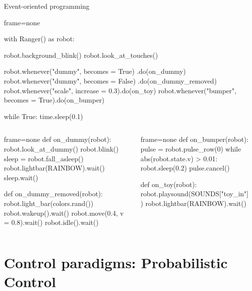 \documentclass[compress]{beamer}
\begin{document}
\begin{frame}[fragile]{Event-oriented programming}
\begin{overprint}
\begin{pythoncode*}{frame=none}

with Ranger() as robot:

    robot.background_blink()
    robot.look_at_touches()

    robot.whenever("dummy", becomes = True)
                                .do(on_dummy)
    robot.whenever("dummy", becomes = False)
                                .do(on_dummy_removed)
    robot.whenever("scale", increase = 0.3).do(on_toy)
    robot.whenever("bumper", becomes = True).do(on_bumper)

    while True:
        time.sleep(0.1)
\end{pythoncode*}

    
    
    \begin{columns}
        \begin{column}{0.45\linewidth}
            \begin{pythoncode*}{frame=none}
def on_dummy(robot):
    robot.look_at_dummy()
    robot.blink()
    sleep = robot.fall_asleep()
    robot.lightbar(RAINBOW).wait()
    sleep.wait()

def on_dummy_removed(robot):
    robot.light_bar(colors.rand())
    robot.wakeup().wait()
    robot.move(0.4, v = 0.8).wait()
    robot.idle().wait()

\end{pythoncode*}
\end{column}
        \begin{column}{0.55\linewidth}
\begin{pythoncode*}{frame=none}
def on_bumper(robot):
    pulse = robot.pulse_row(0)
    while abs(robot.state.v) > 0.01:
        robot.sleep(0.2)
    pulse.cancel()

def on_toy(robot):
    robot.playsound(SOUNDS["toy_in"])
    robot.lightbar(RAINBOW).wait()
\end{pythoncode*}
        \end{column}
    \end{columns}
\end{overprint}
\end{frame}

\section{Control paradigms: Probabilistic Control}
\end{document}
